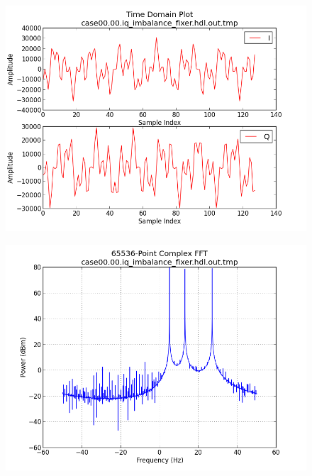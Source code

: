\documentclass{article}
\begin{document}
	\begin{figure}[ht]
		\centering
		\begin{minipage}{.5\textwidth}
			\centering\includegraphics[width=1.0\linewidth]{output_time_tones}
			\label{fig:out_time_tone}
		\end{minipage}%
		\begin{minipage}{.5\textwidth}
			\centering\includegraphics[width=1.0\linewidth]{output_freq_tones}
			\label{fig:out_freq_tone}
		\end{minipage}
	\end{figure}
\end{document}
